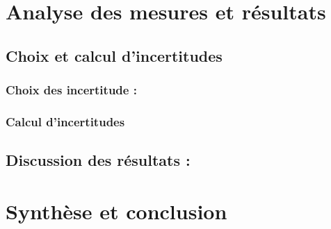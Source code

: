 \documentclass[12pt,a4paper]{article}
\begin{document}
    \section{Analyse des mesures et résultats}
    \subsection{Choix et calcul d'incertitudes}
    \subsubsection{Choix des incertitude :}
    \subsubsection{Calcul d'incertitudes}
    \subsection{Discussion des résultats :}
    \section{Synthèse et conclusion}
\end{document}
